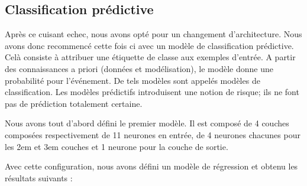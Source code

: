 
\subsection{Classification prédictive}

Après ce cuisant echec, nous avons opté pour un changement d'architecture. Nous avons donc recommencé cette fois ci avec
un modèle de classification prédictive. Celà consiste à attribuer une étiquette de classe aux exemples d'entrée. A partir des
connaissances a priori (données et modélisation), le modèle donne une probabilité pour l’événement. De tels modèles sont
appelés modèles de classification. Les modèles prédictifs introduisent une notion de risque; ils ne font pas de prédiction
totalement certaine.

\vspace{1.5cm}

Nous avons tout d'abord défini le premier modèle. Il est composé de 4 couches composées
respectivement de 11 neurones en entrée, de 4 neurones chacunes pour les 2em et 3em couches
et 1 neurone pour la couche de sortie.

Avec cette configuration, nous avons défini un modèle de régression et obtenu
les résultats suivants :

